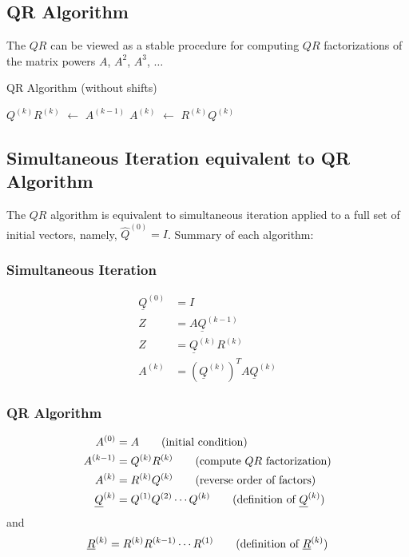 \documentclass[12pt]{article}
\theoremstyle{definition}
\newcommand*\Let[2]{\State #1 $\gets$ #2}
\theoremstyle{definition}
\begin{document}
\subsection{QR Algorithm}
The $QR$ can be viewed as a stable procedure for computing $QR$ factorizations of the matrix powers $A$, $A^2$, $A^3$, $\ldots$

\begin{algorithm}[ht]
  \caption{QR Algorithm (without shifts)}
  \begin{algorithmic}[1]
	    \Let{$Q^{(k)}R^{(k)}$}{$A^{(k-1)}$} 
	    \Let{$A^{(k)}$}{$R^{(k)}Q^{(k)}$} 
    \EndFor
  \end{algorithmic}
\end{algorithm}

\subsection{Simultaneous Iteration equivalent to QR Algorithm}
The $QR$ algorithm is equivalent to simultaneous iteration applied to a full set of initial vectors, namely, $\hat Q^{(0)} = I$. Summary of each algorithm:

\subsubsection*{Simultaneous Iteration}
\begin{align}
	\underline Q^{(0)} &= I \tag{initial condition} \\
	Z &= A \underline Q^{(k-1)} \tag{apply $A$}\\
	Z &= \underline Q^{(k)} R^{(k)} \tag{resemblence of normalization, $QR$ factorization of $Z$} \\
	A^{(k)} &= (\underline Q^{(k)})^T A \underline Q^{(k)} \tag{resemblence of Rayleigh quotient}
\end{align}

\subsubsection*{QR Algorithm}
\begin{align}
	A^{(0)} &= A \tag{initial condition}\\
	A^{(k-1)} &= Q^{(k)}R^{(k)} \tag{compute $QR$ factorization}\\
	A^{(k)} &= R^{(k)}Q^{(k)} \tag{reverse order of factors}\\
	\underline Q^{(k)} &= Q^{(1)} Q^{(2)} \cdots Q^{(k)} \tag{definition of $\underline Q^{(k)}$}
\end{align} 
and 
\begin{equation}
	\underline R^{(k)} = R^{(k)} R^{(k-1)} \cdots R^{(1)} \tag{definition of $\underline R^{(k)}$}
\end{equation}
\end{document}
